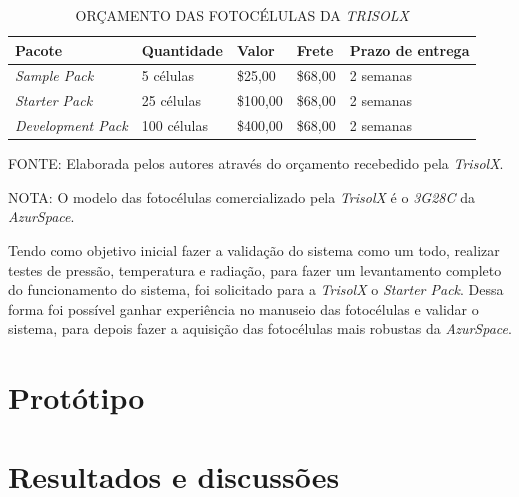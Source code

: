\documentclass[
	12pt,				%
	openright,			%
	oneside,			%
	a4paper,			%
	english,			%
	french,				%
	spanish,			%
	brazil,				%
	oldfontcommands
	]{abntex2}
\begin{document}
	\begin{table}[th]
	\caption{ORÇAMENTO DAS FOTOCÉLULAS DA \textit{TRISOLX}}
	\centering
	\begin{tabular}{p{3.5cm}|p{2.5cm}|p{1.5cm}|p{1.5cm}|p{2.0cm}}
		\textbf{Pacote} & \textbf{Quantidade} & \textbf{Valor} & \textbf{Frete} & \textbf{Prazo de entrega}\\
		\hline
		\textit{Sample Pack} & 5 células & \$25,00 &  \$68,00 & 2 semanas\\
		\textit{Starter Pack} & 25 células & \$100,00 &  \$68,00 & 2 semanas\\
		\textit{Development Pack} & 100 células & \$400,00 & \$68,00 & 2 semanas\\
	\end{tabular}
	
	\begin{small}
	\vspace{3pt}
		FONTE: Elaborada pelos autores através do orçamento recebedido pela \textit{TrisolX}.
	\end{small}
	
	\begin{footnotesize}
		NOTA: O modelo das fotocélulas comercializado pela \textit{TrisolX} é o \textit{3G28C} da \textit{AzurSpace}.
	\end{footnotesize}
	\end{table}	
	
	Tendo como objetivo inicial fazer a validação do sistema como um todo, realizar testes de pressão, temperatura e radiação, para fazer um levantamento completo do funcionamento do sistema, foi solicitado para a \textit{TrisolX} o \textit{Starter Pack}. Dessa forma foi possível ganhar experiência no manuseio das fotocélulas e validar o sistema, para depois fazer a aquisição das fotocélulas mais robustas da \textit{AzurSpace}.
	
\chapter[Protótipo]{Protótipo}

\chapter[Resultados e discussões]{Resultados e discussões}
\end{document}
